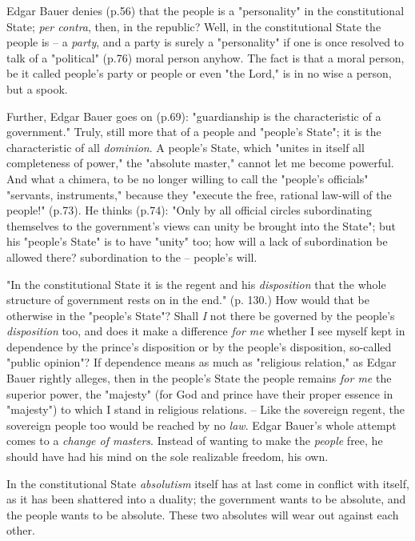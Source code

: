 \documentclass[a4paper]{book}
\begin{document}
Edgar Bauer denies (p.56) that the people is a "{}personality"{} in the 
constitutional State; \textit{per contra}, then, in the republic? Well, in the 
constitutional State the people is -- a \textit{party}, and a party is surely 
a "{}personality"{} if one is once resolved to talk of a "{}political"{} 
(p.76) moral person anyhow. The fact is that a moral person, be it called 
people's party or people or even "{}the Lord,"{} is in no wise a person, but a 
spook.

Further, Edgar Bauer goes on (p.69): "{}guardianship is the characteristic of 
a government."{} Truly, still more that of a people and "{}people's State"{}; 
it is the characteristic of all \textit{dominion}. A people's State, which 
"{}unites in itself all completeness of power,"{} the "{}absolute master,"{} 
cannot let me become powerful. And what a chimera, to be no longer willing to 
call the "{}people's officials"{} "{}servants, instruments,"{} because they 
"{}execute the free, rational law-will of the people!"{} (p.73). He thinks 
(p.74): "{}Only by all official circles subordinating themselves to the 
government's views can unity be brought into the State"{}; but his "{}people's 
State"{} is to have "{}unity"{} too; how will a lack of subordination be 
allowed there? subordination to the -- people's will.

"{}In the constitutional State it is the regent and his \textit{disposition} 
that the whole structure of government rests on in the end."{} (p. 130.) How 
would that be otherwise in the "{}people's State"{}? Shall \textit{I} not 
there be governed by the people's \textit{disposition} too, and does it make a 
difference \textit{for me} whether I see myself kept in dependence by the 
prince's disposition or by the people's disposition, so-called "{}public 
opinion"{}? If dependence means as much as "{}religious relation,"{} as Edgar 
Bauer rightly alleges, then in the people's State the people remains 
\textit{for me} the superior power, the "{}majesty"{} (for God and prince have 
their proper essence in "{}majesty"{}) to which I stand in religious 
relations. -- Like the sovereign regent, the sovereign people too would be 
reached by no \textit{law}. Edgar Bauer's whole attempt comes to a 
\textit{change of masters}. Instead of wanting to make the \textit{people} 
free, he should have had his mind on the sole realizable freedom, his own.

In the constitutional State \textit{absolutism} itself has at last come in 
conflict with itself, as it has been shattered into a duality; the government 
wants to be absolute, and the people wants to be absolute. These two absolutes 
will wear out against each other.
\end{document}
